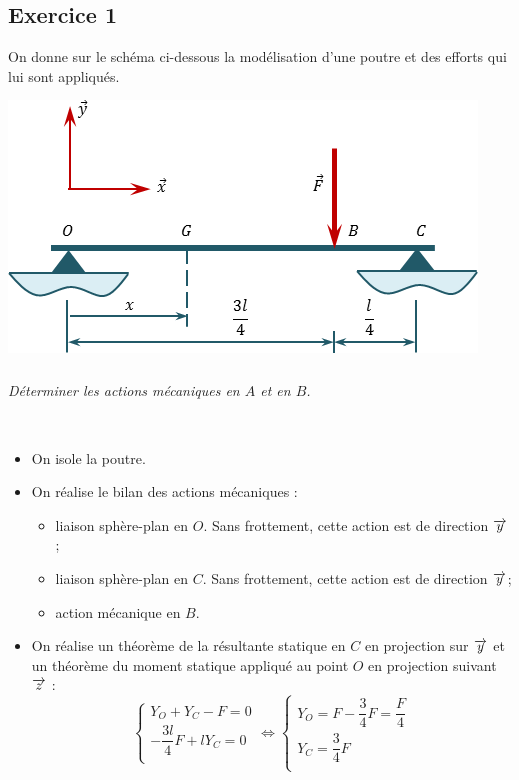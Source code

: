 \documentclass[10pt,fleqn]{article} %
\begin{document}

\vspace{8cm}
\pagestyle{fancy}
\thispagestyle{plain}


\def\columnseprulecolor{\color{ocre}}
\setlength{\columnseprule}{0.4pt} 
\ifprof
\else
\begin{multicols}{2}
\fi

\section*{Exercice 1}
\setcounter{subparagraph}{0}
On donne sur le schéma ci-dessous la modélisation d'une poutre et des efforts qui lui sont appliqués.
\begin{center}
\includegraphics[width=.45\textwidth]{images/exo_01}
\end{center}

\subparagraph{}
\textit{Déterminer les actions mécaniques en $A$ et en $B$.}
\ifprof
\begin{corrige}~\\

\begin{itemize}[label=,font=\color{ocre}] 
\item On isole la poutre.
\item On réalise le bilan des actions mécaniques :
\begin{itemize}[label=,font=\color{ocre} \footnotesize] 
\item liaison sphère-plan en $O$. Sans frottement, cette action est de direction $\overrightarrow{y}$;
\item liaison sphère-plan en $C$. Sans frottement, cette action est de direction $\overrightarrow{y}$;
\item action mécanique en $B$.
\end{itemize}
\item On réalise un théorème de la résultante statique en $C$ en projection sur $\overrightarrow{y}$ et un théorème du moment statique appliqué au point $O$ en projection suivant $\overrightarrow{z}$ :
$$
\left\{
\begin{array}{l}
Y_O + Y_C -F = 0 \\
-\dfrac{3l}{4}F + l Y_C = 0 \\
\end{array}
\right.
\Leftrightarrow
\left\{
\begin{array}{l}
Y_O = F -  \dfrac{3}{4}F  = \dfrac{F}{4} \\
Y_C = \dfrac{3}{4}F \\
\end{array}
\right.
$$
\end{itemize}


\end{corrige}
\end{multicols}
\end{document}
